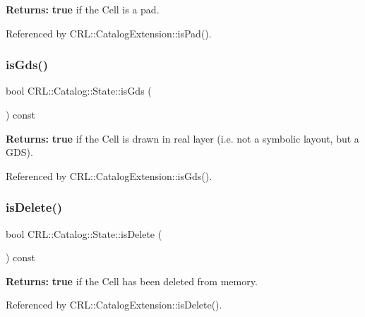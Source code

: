 {\bfseries Returns\+:} {\bfseries true} if the Cell is a pad. 

Referenced by C\+R\+L\+::\+Catalog\+Extension\+::is\+Pad().

\mbox{\label{classCRL_1_1Catalog_1_1State_a7af8d732bf9cea0b0ddb4eca3b0528ec}} 
\subsubsection{\texorpdfstring{is\+Gds()}{isGds()}}
{\footnotesize\ttfamily bool C\+R\+L\+::\+Catalog\+::\+State\+::is\+Gds (\begin{DoxyParamCaption}{ }\end{DoxyParamCaption}) const\hspace{0.3cm}{\ttfamily [inline]}}

{\bfseries Returns\+:} {\bfseries true} if the Cell is drawn in real layer (i.\+e. not a symbolic layout, but a G\+DS). 

Referenced by C\+R\+L\+::\+Catalog\+Extension\+::is\+Gds().

\mbox{\label{classCRL_1_1Catalog_1_1State_ac6df038ecb133b973f9b9f2a5e858ca5}} 
\subsubsection{\texorpdfstring{is\+Delete()}{isDelete()}}
{\footnotesize\ttfamily bool C\+R\+L\+::\+Catalog\+::\+State\+::is\+Delete (\begin{DoxyParamCaption}{ }\end{DoxyParamCaption}) const\hspace{0.3cm}{\ttfamily [inline]}}

{\bfseries Returns\+:} {\bfseries true} if the Cell has been deleted from memory. 

Referenced by C\+R\+L\+::\+Catalog\+Extension\+::is\+Delete().

\mbox{\label{classCRL_1_1Catalog_1_1State_a72b60d86f25221fd8fe7a5902be528a2}} 
